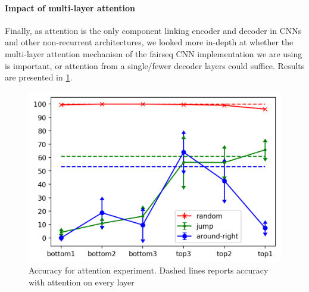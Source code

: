 \paragraph{Impact of multi-layer attention}
\label{subsec:exp3}

Finally, as attention is the only component linking encoder and
decoder in CNNs and other non-recurrent architectures, we looked more
in-depth at whether the multi-layer attention mechanism of the fairseq 
CNN implementation we are using is important, or attention from a
single/fewer decoder layers could suffice. Results are presented in
\ref{fig:exp3}.

\begin{figure}[tb]
    \centering
    \includegraphics[width=.5\textwidth,keepaspectratio]{figures/attention_exp.png}
    \caption{Accuracy for attention experiment. Dashed lines reports accuracy with attention on every layer}
    \label{fig:exp3}
\end{figure}

